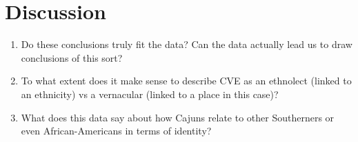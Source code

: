 \documentclass{beamer}
\begin{document}
  \section{Discussion}
    \begin{frame}
      \begin{block}{}
        \begin{enumerate}
          \item Do these conclusions truly fit the data? Can the data actually lead us to draw conclusions of this sort?
          \item To what extent does it make sense to describe CVE as an ethnolect (linked to an ethnicity) vs a vernacular (linked to a place in this case)?
          \item What does this data say about how Cajuns relate to other Southerners or even African-Americans in terms of identity?
        \end{enumerate}
      \end{block}
    \end{frame}
\end{document}
